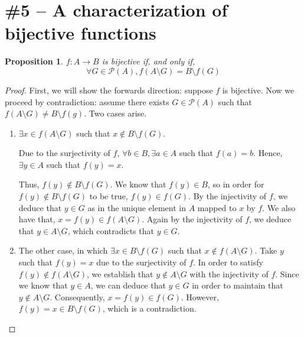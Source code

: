 \documentclass[11pt,letterpaper]{article}
\newtheorem{prop}{Proposition}
\begin{document}
\section*{\#5 -- A characterization of bijective functions}

\begin{prop}
    $f : A \to B$ is bijective if, and only if,
    \begin{equation*}
        \forall G \in \mathcal{P}(A), f(A \setminus G) = B \setminus f(G)
    \end{equation*}
\end{prop}

\begin{proof}
    First, we will show the forwards direction: suppose $f$ is bijective. Now
    we proceed by contradiction: assume there exists $G \in \mathcal{P}(A)$
    such that $f(A \setminus G) \neq B \setminus f(g)$. Two cases arise.

    \begin{enumerate}
        \item $\exists x \in f(A \setminus G)$ such that
            $x \notin B \setminus f(G)$.

            Due to the surjectivity of $f$,
            $\forall b \in B, \exists a \in A$ such that $f(a) = b$.
            Hence, $\exists y \in A$ such that $f(y) = x$.

            Thus, $f(y) \notin B \setminus f(G)$. We know that $f(y) \in B$, so
            in order for $f(y) \notin B \setminus f(G)$ to be true,
            $f(y) \in f(G)$. By the injectivity of $f$, we deduce that
            $y \in G$ as in the unique element in $A$ mapped to $x$ by $f$.
            We also have that, $x = f(y) \in f(A \setminus G)$. Again by the
            injectivity of $f$, we deduce that $y \in A \setminus G$, which
            contradicts that $y \in G$.

        \item The other case, in which $\exists x \in B \setminus f(G)$
            such that $x \notin f(A \setminus G)$. Take $y$ such that
            $f(y) = x$ due to the surjectivity of $f$. In order to satisfy
            $f(y) \notin f(A \setminus G)$, we establish that
            $y \notin A \setminus G$ with the injectivity of $f$. Since we know
            that $y \in A$, we can deduce that $y \in G$ in order to maintain
            that $y \notin A \setminus G$. Consequently, $x = f(y) \in f(G)$.
            However, $f(y) = x \in B \setminus f(G)$, which is a contradiction.
    \end{enumerate}


\end{proof}
\end{document}

